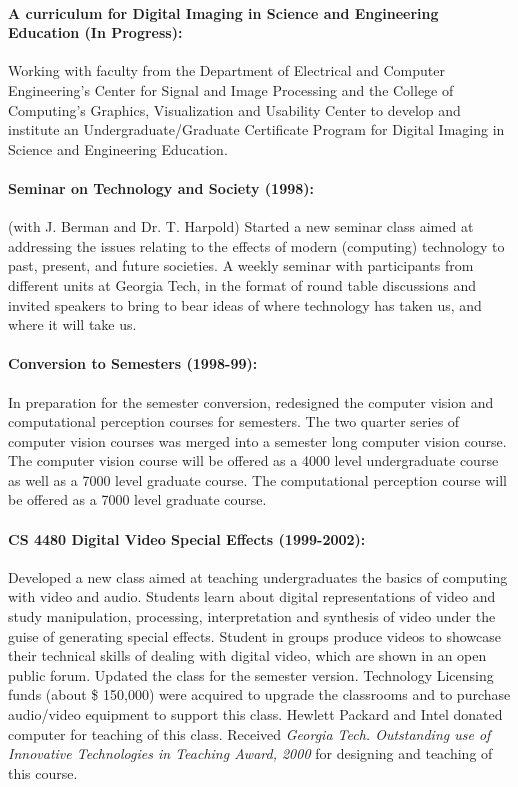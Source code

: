 \paragraph{A curriculum for Digital Imaging in Science and Engineering
Education (In Progress):} Working with faculty from the Department
of Electrical and Computer Engineering's Center for Signal and
Image Processing and the College of Computing's Graphics,
Visualization and Usability Center to develop and institute an
Undergraduate/Graduate Certificate Program for Digital Imaging in
Science and Engineering Education.

\paragraph{Seminar on Technology and Society (1998):} (with J. Berman and Dr.
T. Harpold) Started a new seminar class aimed at addressing the
issues relating to the effects of modern (computing) technology to
past, present, and future societies. A weekly seminar with
participants from different units at Georgia Tech, in the format
of round table discussions and invited speakers to bring to bear
ideas of where technology has taken us, and where it will take us.

\paragraph{Conversion to Semesters (1998-99):} In preparation for the semester
conversion, redesigned the computer vision and computational perception
courses for semesters. The two quarter series of computer vision courses was
merged into a semester long computer vision course. The computer vision
course will be offered as a 4000 level undergraduate course as well as a
7000 level graduate course. The computational perception course will be
offered as a 7000 level graduate course.

\paragraph{CS 4480 Digital Video Special Effects (1999-2002):} Developed a new
class aimed at teaching undergraduates the basics of computing
with video and audio. Students learn about digital representations
of video and study manipulation, processing, interpretation and
synthesis of video under the guise of generating special effects.
Student in groups produce videos to showcase their technical
skills of dealing with digital video, which are shown in an open
public forum. Updated the class for the semester version.
Technology Licensing funds (about \$ 150,000) were acquired to
upgrade the classrooms and to purchase audio/video equipment to
support this class.  Hewlett Packard and Intel donated computer
for teaching of this class. Received \textsl{Georgia Tech. Outstanding use of Innovative Technologies in Teaching Award, 2000} for designing and teaching of this course.

